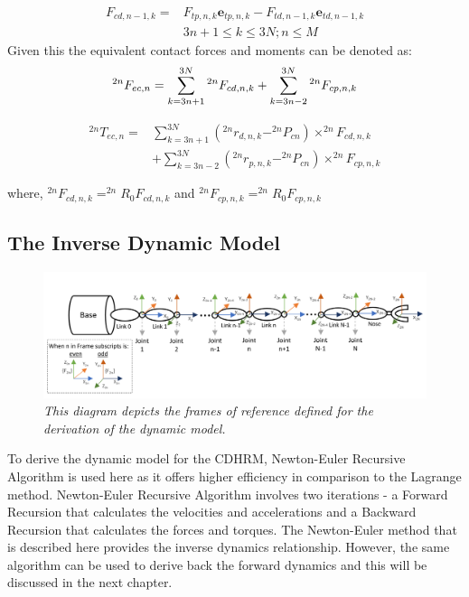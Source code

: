 \documentclass[a4paper,12pt]{report}
\begin{document}
\begin{equation}
\begin{aligned}
F_{c d, n-1, k}=& F_{t p, n, k} \boldsymbol{e}_{t p, n, k}-F_{t d, n-1, k} \boldsymbol{e}_{t d, n-1, k} \\
& 3 n+1 \leq k \leq 3 N ; n \leq M
\end{aligned}
\end{equation}
Given this the equivalent contact forces and moments can be denoted as:
\begin{equation}
\label{contact-forces}
^{2 n}F_{e c, n}=\sum_{k=3 n+1}^{3 N} \hspace{0.1pt} ^{2 n}F_{c d, n, k} + \sum^{3 N}_{k=3 n-2}  \hspace{0.1pt} ^{2 n}F_{c p, n, k}
\end{equation}

\begin{equation}
\label{contact-moments}
\begin{aligned}
^{2 n} T_{e c, n}=& \sum_{k=3 n+1}^{3 N}\left(^{2 n}r_{d, n, k} - ^{2 n}P_{c n}\right) \times^{2 n} F_{c d, n, k} \\
&+\sum_{k=3 n-2}^{3 N}\left(^{2 n}r_{p, n, k} - ^{2 n}P_{c n}\right) \times^{2 n} F_{c p, n, k}
\end{aligned}
\end{equation} 

where, $^{2 n} F_{c d, n, k}=^{2 n}R_{0} F_{c d, n, k}$ and $^{2 n}F_{c p, n, k}=^{2 n} R_{0} F_{c p, n, k}$

\subsection{The Inverse Dynamic Model}
\label{DM-section}

\begin{figure}[!tbh]
	\centering
	\includegraphics[width=\textwidth]{images/Dynamic Frames.png}
	\caption{\textit{This diagram depicts the frames of reference defined for the derivation of the dynamic model.}}
	\label{dynamic-frames}
\end{figure}
To derive the dynamic model for the CDHRM, Newton-Euler Recursive Algorithm is used here as it offers higher efficiency in comparison to the Lagrange method. Newton-Euler Recursive Algorithm involves two iterations - a Forward Recursion that calculates the velocities and accelerations and a Backward Recursion that calculates the forces and torques. The Newton-Euler method that is described here provides the inverse dynamics relationship. However, the same algorithm can be used to derive back the forward dynamics and this will be discussed in the next chapter. 
\end{document}
